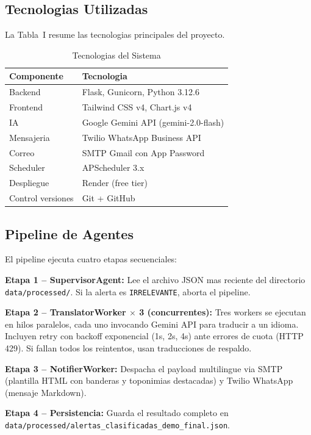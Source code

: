 \documentclass[10pt,twocolumn,a4paper]{article}
\begin{document}
\subsection{Tecnologias Utilizadas}

La Tabla~I resume las tecnologias principales del proyecto.

\begin{table}[t]
\caption{Tecnologias del Sistema}
\label{tab:tecnologias}
\centering
\small
\begin{tabular}{p{2.5cm}|p{4cm}}
\hline
\textbf{Componente} & \textbf{Tecnologia} \\
\hline
Backend & Flask, Gunicorn, Python 3.12.6 \\
\hline
Frontend & Tailwind CSS v4, Chart.js v4 \\
\hline
IA & Google Gemini API (gemini-2.0-flash) \\
\hline
Mensajeria & Twilio WhatsApp Business API \\
\hline
Correo & SMTP Gmail con App Password \\
\hline
Scheduler & APScheduler 3.x \\
\hline
Despliegue & Render (free tier) \\
\hline
Control versiones & Git + GitHub \\
\hline
\end{tabular}
\end{table}

\subsection{Pipeline de Agentes}

El pipeline ejecuta cuatro etapas secuenciales:

\textbf{Etapa 1 -- SupervisorAgent:} Lee el archivo JSON mas
reciente del directorio \texttt{data/processed/}. Si la alerta es
\texttt{IRRELEVANTE}, aborta el pipeline.

\textbf{Etapa 2 -- TranslatorWorker $\times$ 3 (concurrentes):}
Tres workers se ejecutan en hilos paralelos, cada uno invocando
Gemini API para traducir a un idioma. Incluyen retry con backoff
exponencial (1s, 2s, 4s) ante errores de cuota (HTTP 429). Si
fallan todos los reintentos, usan traducciones de respaldo.

\textbf{Etapa 3 -- NotifierWorker:} Despacha el payload
multilingue via SMTP (plantilla HTML con banderas y toponimias
destacadas) y Twilio WhatsApp (mensaje Markdown).

\textbf{Etapa 4 -- Persistencia:} Guarda el resultado completo en
\texttt{data/processed/alertas\_clasificadas\_demo\_final.json}.
\end{document}
